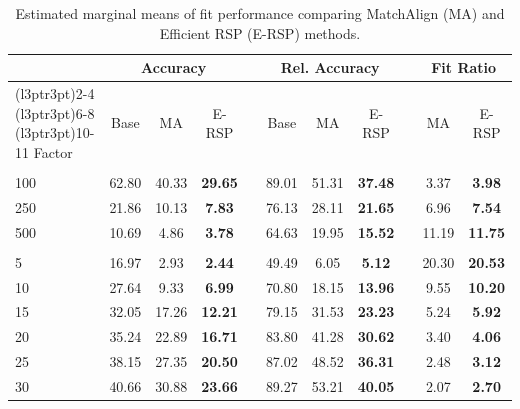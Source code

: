 \documentclass[
  man,
  longtable,
  nolmodern,
  notxfonts,
  notimes,
  colorlinks=true,linkcolor=blue,citecolor=blue,urlcolor=blue]{apa7}
\theoremstyle{plain}
\theoremstyle{plain}
\theoremstyle{remark}
\begin{document}
\begin{table}
\centering
\caption{\label{tab:simres_2_acc}Estimated marginal means of fit performance comparing MatchAlign (MA) and Efficient RSP (E-RSP) methods.}
\centering
\begin{threeparttable}
\begin{tabular}[t]{lcccccccccc}
\toprule
\multicolumn{1}{c}{ } & \multicolumn{3}{c}{Accuracy} & \multicolumn{1}{c}{ } & \multicolumn{3}{c}{Rel. Accuracy} & \multicolumn{1}{c}{ } & \multicolumn{2}{c}{Fit Ratio} \\
\cmidrule(l{3pt}r{3pt}){2-4} \cmidrule(l{3pt}r{3pt}){6-8} \cmidrule(l{3pt}r{3pt}){10-11}
Factor & Base & MA & E-RSP &  & Base & MA & E-RSP &  & MA & E-RSP\\
\midrule
\addlinespace[0.3em]
\multicolumn{11}{l}{\textbf{N}}\\
\hspace{1em}100 & 62.80 & 40.33 & \textbf{29.65} &  & 89.01 & 51.31 & \textbf{37.48} &  & 3.37 & \textbf{3.98}\\
\hspace{1em}250 & 21.86 & 10.13 & \textbf{7.83} &  & 76.13 & 28.11 & \textbf{21.65} &  & 6.96 & \textbf{7.54}\\
\hspace{1em}500 & 10.69 & 4.86 & \textbf{3.78} &  & 64.63 & 19.95 & \textbf{15.52} &  & 11.19 & \textbf{11.75}\\
\addlinespace[0.3em]
\multicolumn{11}{l}{\textbf{M}}\\
\hspace{1em}5 & 16.97 & 2.93 & \textbf{2.44} &  & 49.49 & 6.05 & \textbf{5.12} &  & 20.30 & \textbf{20.53}\\
\hspace{1em}10 & 27.64 & 9.33 & \textbf{6.99} &  & 70.80 & 18.15 & \textbf{13.96} &  & 9.55 & \textbf{10.20}\\
\hspace{1em}15 & 32.05 & 17.26 & \textbf{12.21} &  & 79.15 & 31.53 & \textbf{23.23} &  & 5.24 & \textbf{5.92}\\
\hspace{1em}20 & 35.24 & 22.89 & \textbf{16.71} &  & 83.80 & 41.28 & \textbf{30.62} &  & 3.40 & \textbf{4.06}\\
\hspace{1em}25 & 38.15 & 27.35 & \textbf{20.50} &  & 87.02 & 48.52 & \textbf{36.31} &  & 2.48 & \textbf{3.12}\\
\hspace{1em}30 & 40.66 & 30.88 & \textbf{23.66} &  & 89.27 & 53.21 & \textbf{40.05} &  & 2.07 & \textbf{2.70}\\

\end{tabular}
\end{threeparttable}
\end{table}
\end{document}
